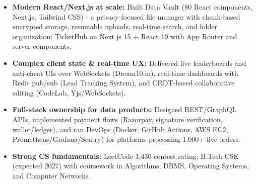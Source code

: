 \documentclass[]{cover}
\begin{document}


\currentdate{\today}



{\raggedright{}\fontsize{11pt}{13pt}\selectfont
\renewcommand{\labelitemi}{\textbullet}
\renewcommand{\labelitemii}{\textbullet}
\renewcommand{\labelitemiii}{\textbullet}
\begin{itemize}
    \item \textbf{Modern React/Next.js at scale:} Built Data Vault (80 React components, Next.js, Tailwind CSS) - a privacy-focused file manager with chunk-based encrypted storage, resumable uploads, real-time search, and folder organization; TicketHub on Next.js 15 + React 19 with App Router and server components.
    \item \textbf{Complex client state \& real-time UX:} Delivered live leaderboards and anti-cheat UIs over WebSockets (Dream10.in), real-time dashboards with Redis pub/sub (Lead Tracking System), and CRDT-based collaborative editing (CodeLab, Yjs/WebSockets).
    \item \textbf{Full-stack ownership for data products:} Designed REST/GraphQL APIs, implemented payment flows (Razorpay, signature verification, wallet/ledger), and ran DevOps (Docker, GitHub Actions, AWS EC2, Prometheus/Grafana/Sentry) for platforms processing 1,000+ live orders.
    \item \textbf{Strong CS fundamentals:} LeetCode 1,430 contest rating; B.Tech CSE (expected 2027) with coursework in Algorithms, DBMS, Operating Systems, and Computer Networks.
\end{itemize}\par}
\vspace{6pt}
\end{document}
